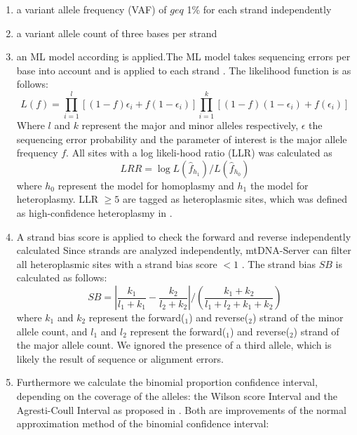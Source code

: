\begin{enumerate}
\item  a variant allele frequency (VAF) of $geq$ 1\% for each strand independently  
\item  a variant allele count of three bases per strand 
\item  an ML model according \cite{Ye2014} is applied.The ML model takes sequencing errors per base into account and is applied to each strand \cite{Weissensteiner2016b}. The likelihood function is as follows:
\begin{equation}
  L(f)=\prod_{i=1}^{l} [(1-f) \epsilon_{i} + f(1-\epsilon_i)] \prod_{i=1}^{k} [(1-f) (1- \epsilon_{i}) + f(\epsilon_i)] 
\end{equation}
Where $l$ and $k$ represent the major and minor alleles respectively, $\epsilon$ the sequencing error probability and the parameter of interest is the major allele frequency $f$. 
All sites with a log likeli-hood ratio (LLR) was calculated as 
\begin{equation}
  LRR=\log L({\widehat{f}_{h_1}}) /  L({\widehat{f}_{h_0}}) 
\end{equation}
where $h_0$ represent the model for homoplasmy and $h_1$ the model for heteroplasmy. LLR $\geq5$ are tagged as heteroplasmic sites, which was defined as high-confidence heteroplasmy in \cite{Picardi2012}. 
\item  A strand bias score is applied to check the forward and reverse independently calculated Since strands are analyzed independently, mtDNA-Server can filter all heteroplasmic sites with a strand bias score $<1$ \cite{Weissensteiner2016b,Guo2012}. The strand bias $SB$ is calculated as follows:
\begin{equation}\label{eq:llr}
  SB=\left| \frac{k_1}{l_1+k_1} - \frac{k_2}{l_2+k_2} \right| / \left(\frac{k_1 + k_2}{l_1+l_2+k_1+k_2}\right)
\end{equation}
where $k_1$ and $k_2$ represent the forward($_1$) and reverse($_2$) strand of the minor allele count, and $l_1$ and $l_2$ represent the forward($_1$) and reverse($_2$) strand of the major allele count. We ignored the presence of a third allele, which is likely the result of sequence or alignment errors.
\item Furthermore we calculate the binomial proportion confidence interval, depending on the coverage of the alleles: the Wilson score Interval and the Agresti-Coull Interval as proposed in \cite{Calabrese2014}. 
Both are improvements of the normal approximation method of the binomial confidence interval:

\end{enumerate}
